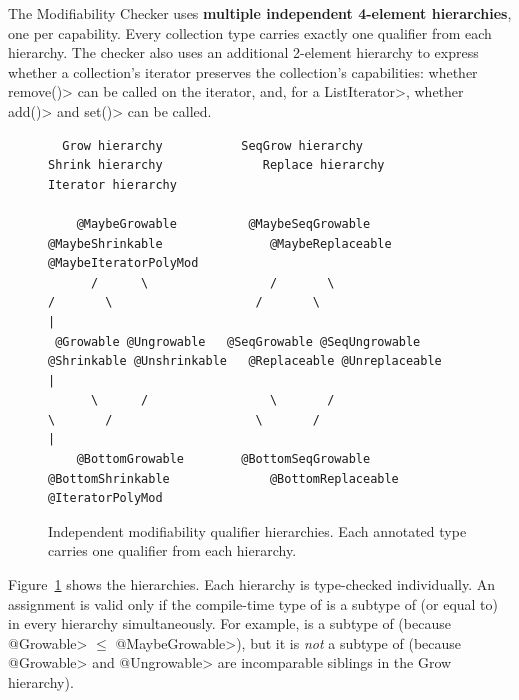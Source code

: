 The Modifiability Checker uses \textbf{multiple independent 4-element
hierarchies}, one per capability.  Every collection type carries exactly
one qualifier from each hierarchy.  The checker also uses an additional
2-element hierarchy to express whether a collection's iterator preserves the
collection's capabilities:  whether \<remove()> can be called on the iterator,
and, for a \<ListIterator>, whether \<add()> and \<set()> can be called.

\begin{figure}
\begin{smaller}
  \centering
  \begin{minipage}{0.85\linewidth}
\begin{verbatim}
  Grow hierarchy           SeqGrow hierarchy             Shrink hierarchy              Replace hierarchy             Iterator hierarchy

    @MaybeGrowable          @MaybeSeqGrowable         @MaybeShrinkable               @MaybeReplaceable           @MaybeIteratorPolyMod
      /      \                 /       \                    /       \                    /       \                          |
 @Growable @Ungrowable   @SeqGrowable @SeqUngrowable  @Shrinkable @Unshrinkable   @Replaceable @Unreplaceable               |
      \      /                 \       /                    \       /                    \       /                          |
    @BottomGrowable        @BottomSeqGrowable          @BottomShrinkable              @BottomReplaceable            @IteratorPolyMod
\end{verbatim}
  \end{minipage}
\end{smaller}
  \caption{Independent modifiability qualifier hierarchies.
    Each annotated type carries one qualifier from each hierarchy.}
  \label{fig-modifiability-lattice}
\end{figure}

Figure~\ref{fig-modifiability-lattice} shows the hierarchies.
Each hierarchy is type-checked individually.
An assignment  is valid only if the compile-time type of  is a
subtype of (or equal to)  in every hierarchy simultaneously.  For
example,  is a
subtype of 
(because \<@Growable> $\le$ \<@MaybeGrowable>), but it is \emph{not} a
subtype of 
(because \<@Growable> and \<@Ungrowable> are incomparable siblings in the
Grow hierarchy).


